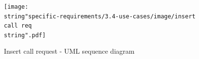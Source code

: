 \clearpage{}

\begin{landscape}

\begin{figure}[H]
\begin{centering}
\texttt{[image: \\string"specific-requirements/3.4-use-cases/image/insert call req\\string".pdf]}
\par\end{centering}

\protect\caption{Insert call request - UML sequence diagram}
\end{figure}


\end{landscape}
